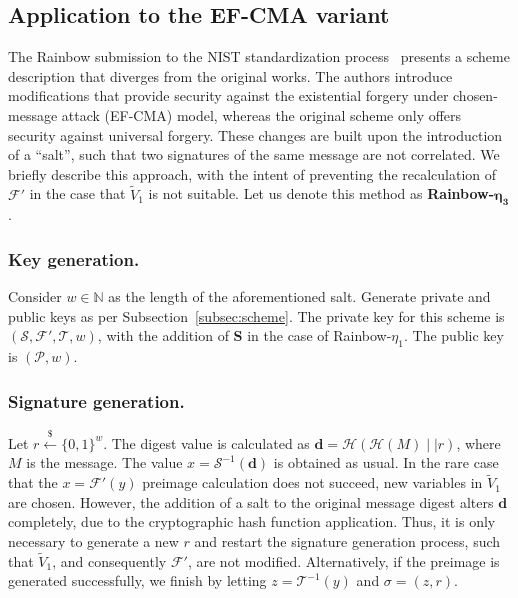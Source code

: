 \documentclass[draft, 12pt, a4paper, oneside]{memoir}
\newcommand{\random}{\stackrel{\$}{\longleftarrow}}
\theoremstyle{definition}
\begin{document}
\subsection{Application to the EF-CMA variant}\label{subsec:efcma}

The Rainbow submission to the NIST standardization
process~\cite{Ding:201712} presents a scheme description that diverges
from the original works. The authors introduce modifications that provide
security against the existential forgery under chosen-message attack (EF-CMA)
model, whereas the original scheme only offers security against universal
forgery. These changes are built upon the introduction of a ``salt'', such that two signatures of the same message are not correlated. We
briefly describe this approach, with the intent of preventing the
recalculation of $\mathcal{F}'$ in the case that $\widetilde{V}_{1}$ is not
suitable. Let us denote this method as \textbf{Rainbow-}$\mathbf{\eta_{3}}$.

\subsubsection{Key generation.}

Consider $w \in \mathbb{N}$ as the length of the aforementioned salt. Generate
private and public keys as per Subsection~\ref{subsec:scheme}. The private key
for this scheme is $(\mathcal{S}, \mathcal{F}', \mathcal{T}, w)$, with the
addition of $\mathbf{S}$ in the case of Rainbow-$\eta_{1}$. The public key is
$(\mathcal{P}, w)$.

\subsubsection{Signature generation.}

Let $r \random {\{0, 1\}}^{w}$. The digest value is calculated as
$\mathbf{d} = \mathcal{H}(\mathcal{H}(M) \mid\mid r)$, where $M$ is the
message. The value $x = \mathcal{S}^{-1}(\mathbf{d})$ is obtained as usual. In
the rare case that the $x = \mathcal{F}'(y)$ preimage calculation does not
succeed, new variables in $\widetilde{V}_{1}$ are chosen. However, the
addition of a salt to the original message digest alters $\mathbf{d}$
completely, due to the cryptographic hash function application. Thus, it is
only necessary to generate a new $r$ and restart the signature generation
process, such that $\widetilde{V}_{1}$, and consequently $\mathcal{F}'$, are
not modified. Alternatively, if the preimage is generated successfully, we
finish by letting $z = \mathcal{T}^{-1}(y)$ and $\sigma = (z, r)$.
\end{document}
